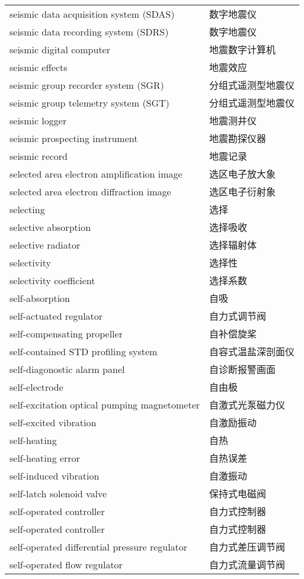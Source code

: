 \documentclass[
]{article}
\begin{document}
\begin{longtable}[]{@{}ll@{}}
seismic data acquisition system (SDAS) & 数字地震仪 \\
seismic data recording system (SDRS) & 数字地震仪 \\
seismic digital computer & 地震数字计算机 \\
seismic effects & 地震效应 \\
seismic group recorder system (SGR) & 分组式遥测型地震仪 \\
seismic group telemetry system (SGT) & 分组式遥测型地震仪 \\
seismic logger & 地震测井仪 \\
seismic prospecting instrument & 地震勘探仪器 \\
seismic record & 地震记录 \\
selected area electron amplification image & 选区电子放大象 \\
selected area electron diffraction image & 选区电子衍射象 \\
selecting & 选择 \\
selective absorption & 选择吸收 \\
selective radiator & 选择辐射体 \\
selectivity & 选择性 \\
selectivity coefficient & 选择系数 \\
self-absorption & 自吸 \\
self-actuated regulator & 自力式调节阀 \\
self-compensating propeller & 自补偿旋桨 \\
self-contained STD profiling system & 自容式温盐深剖面仪 \\
self-diagonostic alarm panel & 自诊断报警画面 \\
self-electrode & 自由极 \\
self-excitation optical pumping magnetometer & 自激式光泵磁力仪 \\
self-excited vibration & 自激励振动 \\
self-heating & 自热 \\
self-heating error & 自热误差 \\
self-induced vibration & 自激振动 \\
self-latch solenoid valve & 保持式电磁阀 \\
self-operated controller & 自力式控制器 \\
self-operated controller & 自力式控制器 \\
self-operated differential pressure regulator & 自力式差压调节阀 \\
self-operated flow regulator & 自力式流量调节阀 \\

\end{longtable}
\end{document}
